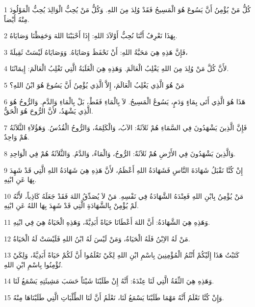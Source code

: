 \par 1 كُلُّ مَنْ يُؤْمِنُ أَنَّ يَسُوعَ هُوَ الْمَسِيحُ فَقَدْ وُلِدَ مِنَ اللهِ. وَكُلُّ مَنْ يُحِبُّ الْوَالِدَ يُحِبُّ الْمَوْلُودَ مِنْهُ أَيْضاً.
\par 2 بِهَذَا نَعْرِفُ أَنَّنَا نُحِبُّ أَوْلاَدَ اللهِ: إِذَا أَحْبَبْنَا اللهَ وَحَفِظْنَا وَصَايَاهُ.
\par 3 فَإِنَّ هَذِهِ هِيَ مَحَبَّةُ اللهِ: أَنْ نَحْفَظَ وَصَايَاهُ. وَوَصَايَاهُ لَيْسَتْ ثَقِيلَةً،
\par 4 لأَنَّ كُلَّ مَنْ وُلِدَ مِنَ اللهِ يَغْلِبُ الْعَالَمَ. وَهَذِهِ هِيَ الْغَلَبَةُ الَّتِي تَغْلِبُ الْعَالَمَ: إِيمَانُنَا.
\par 5 مَنْ هُوَ الَّذِي يَغْلِبُ الْعَالَمَ، إِلاَّ الَّذِي يُؤْمِنُ أَنَّ يَسُوعَ هُوَ ابْنُ اللهِ؟
\par 6 هَذَا هُوَ الَّذِي أَتَى بِمَاءٍ وَدَمٍ، يَسُوعُ الْمَسِيحُ. لاَ بِالْمَاءِ فَقَطْ، بَلْ بِالْمَاءِ وَالدَّمِ. وَالرُّوحُ هُوَ الَّذِي يَشْهَدُ، لأَنَّ الرُّوحَ هُوَ الْحَقُّ.
\par 7 فَإِنَّ الَّذِينَ يَشْهَدُونَ فِي السَّمَاءِ هُمْ ثَلاَثَةٌ: الآبُ، وَالْكَلِمَةُ، وَالرُّوحُ الْقُدُسُ. وَهَؤُلاَءِ الثَّلاَثَةُ هُمْ وَاحِدٌ.
\par 8 وَالَّذِينَ يَشْهَدُونَ فِي الأَرْضِ هُمْ ثَلاَثَةٌ: الرُّوحُ، وَالْمَاءُ، وَالدَّمُ. وَالثَّلاَثَةُ هُمْ فِي الْوَاحِدِ.
\par 9 إِنْ كُنَّا نَقْبَلُ شَهَادَةَ النَّاسِ فَشَهَادَةُ اللهِ أَعْظَمُ، لأَنَّ هَذِهِ هِيَ شَهَادَةُ اللهِ الَّتِي قَدْ شَهِدَ بِهَا عَنِ ابْنِهِ.
\par 10 مَنْ يُؤْمِنُ بِابْنِ اللهِ فَعِنْدَهُ الشَّهَادَةُ فِي نَفْسِهِ. مَنْ لاَ يُصَدِّقُ اللهَ فَقَدْ جَعَلَهُ كَاذِباً، لأَنَّهُ لَمْ يُؤْمِنْ بِالشَّهَادَةِ الَّتِي قَدْ شَهِدَ بِهَا اللهُ عَنِ ابْنِهِ.
\par 11 وَهَذِهِ هِيَ الشَّهَادَةُ: أَنَّ اللهَ أَعْطَانَا حَيَاةً أَبَدِيَّةً، وَهَذِهِ الْحَيَاةُ هِيَ فِي ابْنِهِ.
\par 12 مَنْ لَهُ الاِبْنُ فَلَهُ الْحَيَاةُ، وَمَنْ لَيْسَ لَهُ ابْنُ اللهِ فَلَيْسَتْ لَهُ الْحَيَاةُ.
\par 13 كَتَبْتُ هَذَا إِلَيْكُمْ أَنْتُمُ الْمُؤْمِنِينَ بِاسْمِ ابْنِ اللهِ لِكَيْ تَعْلَمُوا أَنَّ لَكُمْ حَيَاةً أَبَدِيَّةً، وَلِكَيْ تُؤْمِنُوا بِاسْمِ ابْنِ اللهِ.
\par 14 وَهَذِهِ هِيَ الثِّقَةُ الَّتِي لَنَا عِنْدَهُ: أَنَّهُ إِنْ طَلَبْنَا شَيْئاً حَسَبَ مَشِيئَتِهِ يَسْمَعُ لَنَا.
\par 15 وَإِنْ كُنَّا نَعْلَمُ أَنَّهُ مَهْمَا طَلَبْنَا يَسْمَعُ لَنَا، نَعْلَمُ أَنَّ لَنَا الطِّلْبَاتِ الَّتِي طَلَبْنَاهَا مِنْهُ.
